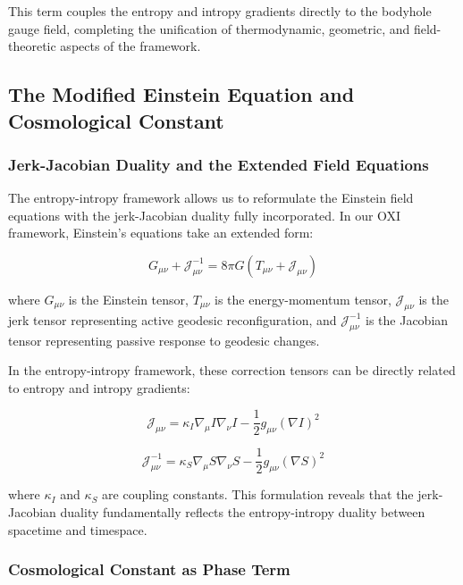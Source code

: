 \documentclass{article}
\begin{document}
This term couples the entropy and intropy gradients directly to the bodyhole gauge field, completing the unification of thermodynamic, geometric, and field-theoretic aspects of the framework.

\subsection{The Modified Einstein Equation and Cosmological Constant}

\subsubsection{Jerk-Jacobian Duality and the Extended Field Equations}

The entropy-intropy framework allows us to reformulate the Einstein field equations with the jerk-Jacobian duality fully incorporated. In our OXI framework, Einstein's equations take an extended form:

\begin{equation}
G_{\mu\nu} + \mathcal{J}^{-1}_{\mu\nu} = 8\pi G (T_{\mu\nu} + \mathcal{J}_{\mu\nu})
\end{equation}

where $G_{\mu\nu}$ is the Einstein tensor, $T_{\mu\nu}$ is the energy-momentum tensor, $\mathcal{J}_{\mu\nu}$ is the jerk tensor representing active geodesic reconfiguration, and $\mathcal{J}^{-1}_{\mu\nu}$ is the Jacobian tensor representing passive response to geodesic changes.

In the entropy-intropy framework, these correction tensors can be directly related to entropy and intropy gradients:

\begin{equation}
\mathcal{J}_{\mu\nu} = \kappa_I \nabla_\mu I \nabla_\nu I - \frac{1}{2}g_{\mu\nu}(\nabla I)^2
\end{equation}

\begin{equation}
\mathcal{J}^{-1}_{\mu\nu} = \kappa_S \nabla_\mu S \nabla_\nu S - \frac{1}{2}g_{\mu\nu}(\nabla S)^2
\end{equation}

where $\kappa_I$ and $\kappa_S$ are coupling constants. This formulation reveals that the jerk-Jacobian duality fundamentally reflects the entropy-intropy duality between spacetime and timespace.

\subsubsection{Cosmological Constant as Phase Term}
\end{document}
